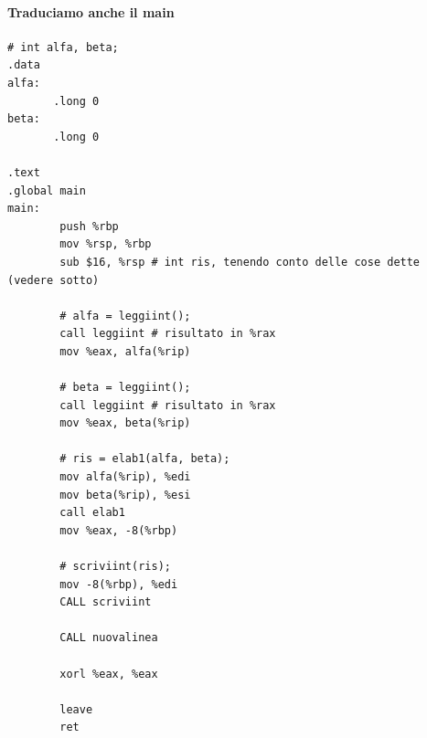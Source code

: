 \documentclass[11pt]{report}
\theoremstyle{definition}
\begin{document}
\paragraph{Traduciamo anche il main}
\begin{verbatim}
# int alfa, beta;
.data
alfa:
       .long 0
beta:
       .long 0

.text
.global main
main:
        push %rbp
        mov %rsp, %rbp
        sub $16, %rsp # int ris, tenendo conto delle cose dette (vedere sotto)
        
        # alfa = leggiint();
        call leggiint # risultato in %rax
        mov %eax, alfa(%rip)
        
        # beta = leggiint();
        call leggiint # risultato in %rax
        mov %eax, beta(%rip)
        
        # ris = elab1(alfa, beta);
        mov alfa(%rip), %edi
        mov beta(%rip), %esi
        call elab1
        mov %eax, -8(%rbp)
        
        # scriviint(ris);
        mov -8(%rbp), %edi
        CALL scriviint
        
        CALL nuovalinea
        
        xorl %eax, %eax
        
        leave
        ret
\end{verbatim}
\end{document}
